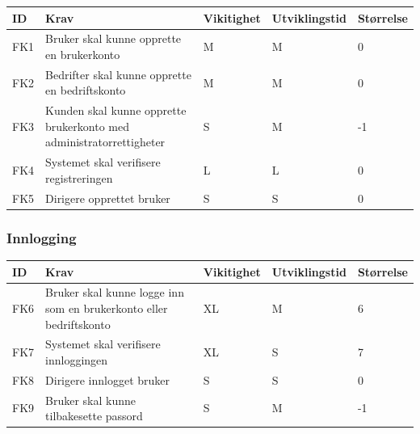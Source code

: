 \documentclass[12pt]{article}
\newcommand{\cello}{\cellcolor{orange!25}}
\newcommand{\celly}{\cellcolor{yellow!25}}
\newcommand{\cellg}{\cellcolor{green!25}}
\begin{document}
        \begin{tabular}{|p{2cm}|p{6cm}|
            >{\centering\arraybackslash}p{2cm}|
            >{\centering\arraybackslash}p{2cm}|
            >{\centering\arraybackslash}p{2cm}|} 
            \hline
            \bf ID & \bf Krav & \bf Vikitighet & \bf Utviklingstid & \bf Størrelse\\
            \hline
            FK1
            &
            Bruker skal kunne opprette en brukerkonto
            & M & M & \celly 0\\
            \hline
            FK2
            &
            Bedrifter skal kunne opprette en bedriftskonto
            & M & M & \celly 0\\
            \hline
            FK3
            &
            Kunden skal kunne opprette brukerkonto med administratorrettigheter
            & S & M & \cello -1\\
            \hline
            FK4
            &
            Systemet skal verifisere registreringen
            & L & L & \celly 0\\
            \hline
            FK5
            &
            Dirigere opprettet bruker
            & S & S & \celly 0\\ %
            \hline
        \end{tabular}
        
        \subsubsection{Innlogging}
        
        \begin{tabular}{|p{2cm}|p{6cm}|
            >{\centering\arraybackslash}p{2cm}|
            >{\centering\arraybackslash}p{2cm}|
            >{\centering\arraybackslash}p{2cm}|} 
            \hline
            \bf ID & \bf Krav & \bf Vikitighet & \bf Utviklingstid & \bf Størrelse\\
            \hline
            FK6
            &
            Bruker skal kunne logge inn som en brukerkonto eller bedriftskonto
            & XL & M & \cellg 6\\
            \hline
            FK7
            &
            Systemet skal verifisere innloggingen
            & XL & S & \cellg 7\\
            \hline
            FK8
            &
            Dirigere innlogget bruker
            & S & S & \celly 0\\
            \hline
            FK9
            &
            Bruker skal kunne tilbakesette passord
            & S & M & \cello -1\\
            \hline
        \end{tabular}
        
\end{document}

